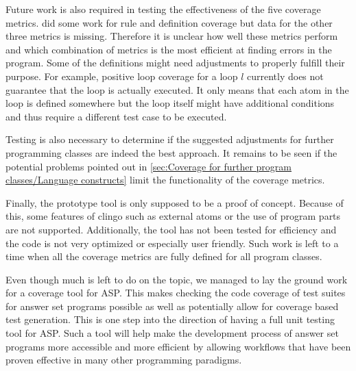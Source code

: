 Future work is also required in testing the effectiveness of the five coverage metrics. \textcite{Jan+11} did some work for rule and definition coverage but data for the other three metrics is missing. Therefore it is unclear how well these metrics perform and which combination of metrics is the most efficient at finding errors in the program. Some of the definitions might need adjustments to properly fulfill their purpose. For example, positive loop coverage for a loop $l$ currently does not guarantee that the loop is actually executed. It only means that each atom in the loop is defined somewhere but the loop itself might have additional conditions and thus require a different test case to be executed.

Testing is also necessary to determine if the suggested adjustments for further programming classes are indeed the best approach. It remains to be seen if the potential problems pointed out in \cref{sec:Coverage for further program classes/Language constructs} limit the functionality of the coverage metrics.

Finally, the prototype tool is only supposed to be a proof of concept. Because of this, some features of clingo such as external atoms or the use of program parts are not supported. Additionally, the tool has not been tested for efficiency and the code is not very optimized or especially user friendly. Such work is left to a time when all the coverage metrics are fully defined for all program classes.

Even though much is left to do on the topic, we managed to lay the ground work for a coverage tool for ASP. This makes checking the code coverage of test suites for answer set programs possible as well as potentially allow for coverage based test generation. This is one step into the direction of having a full unit testing tool for ASP. Such a tool will help make the development process of answer set programs more accessible and more efficient by allowing workflows that have been proven effective in many other programming paradigms.


